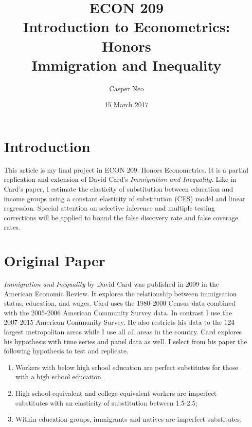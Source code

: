 \documentclass[11pt]{article}
\theoremstyle{definition}
\theoremstyle{remark}
\newcommand{\name}{Casper Neo}
\newcommand{\classname}{Introduction to Econometrics: Honors}
\newcommand{\classnumber}{ECON 209}
\newcommand{\due}{15 March 2017}
\newcommand{\num}{}
\newcommand{\type}{Immigration and Inequality}
\begin{document}
\title{
	\vspace{-20mm}
    \classnumber\\
	\classname\\
    \type \space \num\\
}
\author{
	\name
}
\date{
	\due\\
}

\maketitle

\section{Introduction}

This article is my final project in ECON 209: Honors Econometrics.
It is a partial replication and extension of David Card's
\textit{Immigration and Inequality}. Like in Card's paper, I estimate the
elasticity of substitution between education and income groups using a constant
elasticity of substitution (CES) model and linear regression.
Special attention on selective inference and multiple testing
corrections will be applied to bound the false discovery rate and false coverage
rates.


\renewcommand{\baselinestretch}{0.9}\normalsize
\tableofcontents
\listoffigures
\listoftables
\renewcommand{\baselinestretch}{1.0}\normalsize

\pagebreak
\section{Original Paper}

\textit{Immigration and Inequality} by David Card was published in 2009 in the
American Economic Review. It explores the relationship between immigration
status, education, and wages. Card uses the 1980-2000 Census data combined with
the 2005-2006 American Community Survey data. In contrast I use the 2007-2015
American Community Survey.
He also restricts his data to the 124 largest metropolitan areas while I use all
all areas in the country.
Card explores his hypothesis with time series and
panel data as well. I select from his paper the following hypothesis to
test and replicate.

\begin{enumerate}
    \item Workers with below high school education are perfect substitutes
    for those with a high school education.

    \item High school-equivalent and college-equivalent workers are imperfect
    substitutes with an elasticity of substitution between 1.5-2.5;

    \item Within education groups, immigrants and natives are imperfect
    substitutes.
\end{enumerate}
\end{document}
